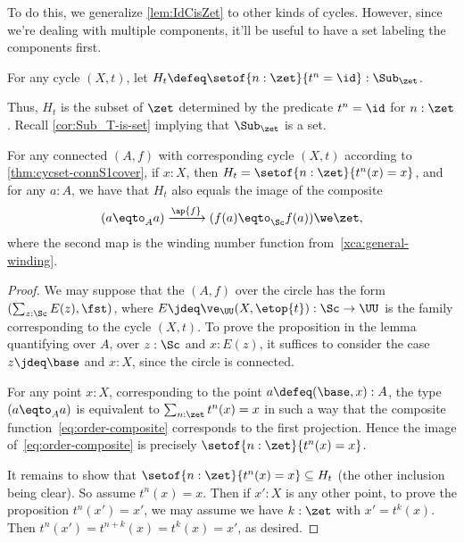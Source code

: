 To do this, we generalize \cref{lem:IdCisZet} to other kinds of cycles.
However, since we're dealing with multiple components,
it'll be useful to have a set labeling the components first.
\begin{definition}\label{def:subgroup-zet-of-cycle}
  For any cycle $(X,t)$,
  let $H_t \defeq \setof{n:\zet}{t^n=\id} : \Sub_\zet$.
\end{definition}
Thus, $H_t$ is the subset of $\zet$ determined by the predicate $t^n=\id$
for $n:\zet$.
Recall \cref{cor:Sub_T-is-set} implying that $\Sub_\zet$ is a set.
\begin{lemma}\label{lem:cycle-order-point-ap}
  For any connected \covering $(A,f)$ with corresponding cycle $(X,t)$
  according to \cref{thm:cycset-connS1cover},
  if $x:X$, then $H_t = \setof{n:\zet}{t^n(x)=x}$,
  and for any $a:A$, we have that $H_t$
  also equals the image of the composite
  \begin{equation}\label{eq:order-composite}
    (a \eqto_A a) \xrightarrow{\ap{f}}{} (f(a) \eqto_\Sc f(a)) \we \zet,
  \end{equation}
  where the second map is the winding number function
  from~\cref{xca:general-winding}.
\end{lemma}
\begin{proof}
  We may suppose that the \covering $(A,f)$ over the circle
  has the form $(\sum_{z:\Sc} E(z),\fst)$, where
  $E\jdeq\ve_\UU(X,\etop{t}) : \Sc\to\UU$ is the family corresponding
  to the cycle $(X,t)$.
  To prove the proposition in the lemma quantifying over $A$, \ie
  over $z:\Sc$ and $x:E(z)$, it suffices to consider the case
  $z\jdeq\base$ and $x:X$, since the circle is connected.

  For any point $x:X$, corresponding to the point $a\defeq(\base,x):A$,
  the type $(a \eqto_A a)$ is equivalent to $\sum_{n:\zet}t^n(x)=x$
  in such a way that the composite function~\eqref{eq:order-composite}
  corresponds to the first projection.
  Hence the image of~\eqref{eq:order-composite} is precisely
  $\setof{n:\zet}{t^n(x)=x}$.

  It remains to show that $\setof{n:\zet}{t^n(x)=x} \subseteq H_t$
  (the other inclusion being clear).
  So assume $t^n(x)=x$.
  Then if $x':X$ is any other point, to prove the proposition
  $t^n(x')=x'$, we may assume we have $k:\zet$ with $x'=t^k(x)$. Then
  $t^n(x')=t^{n+k}(x)=t^k(x)=x'$, as desired.
\end{proof}

